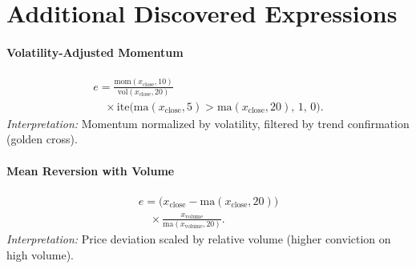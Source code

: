 \section{Additional Discovered Expressions}

\paragraph{Volatility-Adjusted Momentum}
\begin{multline}
e = \frac{\text{mom}(x_{\text{close}}, 10)}{\text{vol}(x_{\text{close}}, 20)} \\
\quad \times \text{ite}\big(\text{ma}(x_{\text{close}}, 5) > \text{ma}(x_{\text{close}}, 20),\, 1,\, 0\big).
\end{multline}
\textit{Interpretation:} Momentum normalized by volatility, filtered by trend confirmation (golden cross).

\paragraph{Mean Reversion with Volume}
\begin{multline}
e = \big(x_{\text{close}} - \text{ma}(x_{\text{close}}, 20)\big) \\
\quad \times \frac{x_{\text{volume}}}{\text{ma}(x_{\text{volume}}, 20)}.
\end{multline}
\textit{Interpretation:} Price deviation scaled by relative volume (higher conviction on high volume).